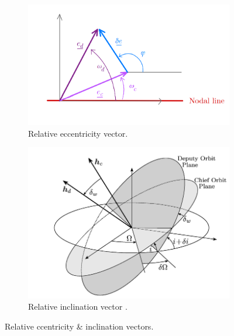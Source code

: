 	\begin{figure}[ht]
	\centering
	\medskip
	\begin{subfigure}[t]{.55\linewidth}
	\centering\includegraphics[width=\linewidth]{Appendices/Appendix_A/ECC_vector}
	\caption{Relative eccentricity vector.}
	\label{fig: 	ECC_vector}
	\end{subfigure}
	\begin{subfigure}[t]{.44\linewidth}
	\centering\includegraphics[width=\linewidth]{Appendices/Appendix_A/inc_vector}
	\caption{Relative inclination vector \cite{Schaub2004} .}
	\label{fig: 	inc_vector}
	\end{subfigure}
	\caption{Relative ccentricity \& inclination vectors. }
	\end{figure}
	\FloatBarrier
